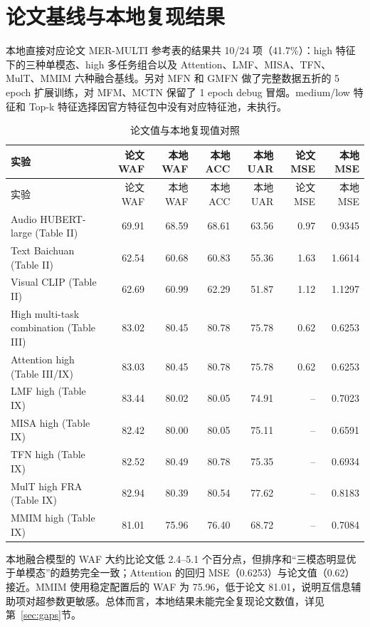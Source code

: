 ﻿\documentclass[a4paper,11pt]{ctexart}
\begin{document}
\section{论文基线与本地复现结果}

本地直接对应论文 MER-MULTI 参考表的结果共 10/24 项（41.7\%）：high 特征下的三种单模态、high 多任务组合以及 Attention、LMF、MISA、TFN、MulT、MMIM 六种融合基线。另对 MFN 和 GMFN 做了完整数据五折的 5 epoch 扩展训练，对 MFM、MCTN 保留了 1 epoch debug 冒烟。medium/low 特征和 Top-k 特征选择因官方特征包中没有对应特征池，未执行。

\scriptsize
\begin{longtable}{p{3.5cm}rrrrrr}
\caption{论文值与本地复现值对照}\\
\toprule
实验 & 论文 WAF & 本地 WAF & 本地 ACC & 本地 UAR & 论文 MSE & 本地 MSE\\
\midrule
\endfirsthead
\toprule
实验 & 论文 WAF & 本地 WAF & 本地 ACC & 本地 UAR & 论文 MSE & 本地 MSE\\
\midrule
\endhead
Audio HUBERT-large (Table II) & 69.91 & 68.59 & 68.61 & 63.56 & 0.97 & 0.9345\\
Text Baichuan (Table II) & 62.54 & 60.68 & 60.83 & 55.36 & 1.63 & 1.6614\\
Visual CLIP (Table II) & 62.69 & 60.99 & 62.29 & 51.87 & 1.12 & 1.1297\\
High multi-task combination (Table III) & 83.02 & 80.45 & 80.78 & 75.78 & 0.62 & 0.6253\\
Attention high (Table III/IX) & 83.03 & 80.45 & 80.78 & 75.78 & 0.62 & 0.6253\\
LMF high (Table IX) & 83.44 & 80.02 & 80.05 & 74.91 & -- & 0.7023\\
MISA high (Table IX) & 82.42 & 80.00 & 80.05 & 75.11 & -- & 0.6591\\
TFN high (Table IX) & 82.52 & 80.49 & 80.78 & 75.35 & -- & 0.6934\\
MulT high FRA (Table IX) & 82.94 & 80.39 & 80.54 & 77.62 & -- & 0.8183\\
MMIM high (Table IX) & 81.01 & 75.96 & 76.40 & 68.72 & -- & 0.7084\\
\bottomrule
\end{longtable}

本地融合模型的 WAF 大约比论文低 2.4--5.1 个百分点，但排序和“三模态明显优于单模态”的趋势完全一致；Attention 的回归 MSE（0.6253）与论文值（0.62）接近。MMIM 使用稳定配置后的 WAF 为 75.96，低于论文 81.01，说明互信息辅助项对超参数更敏感。总体而言，本地结果未能完全复现论文数值，详见第~\ref{sec:gaps}节。
\end{document}
